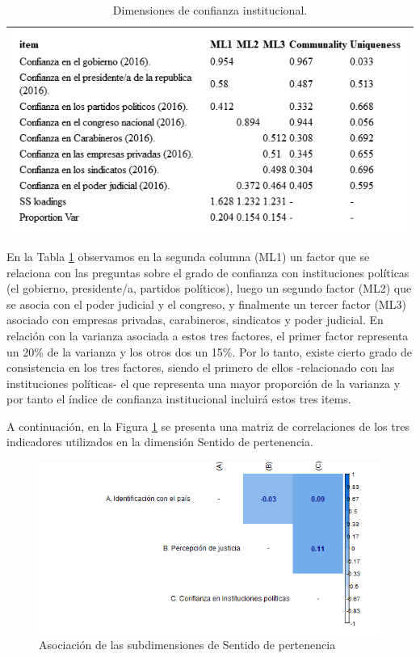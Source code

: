 \documentclass[
  12pt,
]{book}
\begin{document}
\begin{longtable}[]{@{}l@{}}
\caption{\label{tab:inst-fa}Dimensiones de confianza institucional.}\tabularnewline
\toprule
\endhead
\includegraphics[width=8.33333in,height=\textheight]{output/tables/inst_fa.png} \\
\bottomrule
\end{longtable}

En la Tabla \ref{tab:inst-fa} observamos en la segunda columna (ML1) un factor que se relaciona con las preguntas sobre el grado de confianza con instituciones políticas (el gobierno, presidente/a, partidos políticos), luego un segundo factor (ML2) que se asocia con el poder judicial y el congreso, y finalmente un tercer factor (ML3) asociado con empresas privadas, carabineros, sindicatos y poder judicial. En relación con la varianza asociada a estos tres factores, el primer factor representa un 20\% de la varianza y los otros dos un 15\%. Por lo tanto, existe cierto grado de consistencia en los tres factores, siendo el primero de ellos -relacionado con las instituciones políticas- el que representa una mayor proporción de la varianza y por tanto el índice de confianza institucional incluirá estos tres items.

A continuación, en la Figura \ref{fig:sentido-pertenencia} se presenta una matriz de correlaciones de los tres indicadores utilizados en la dimensión Sentido de pertenencia.

\begin{figure}[H]

{\centering \includegraphics[width=1\linewidth,height=1\textheight]{output/graphs/pertenencia_cor} 

}

\caption{Asociación de las subdimensiones de Sentido de pertenencia}\label{fig:sentido-pertenencia}
\end{figure}
\end{document}
